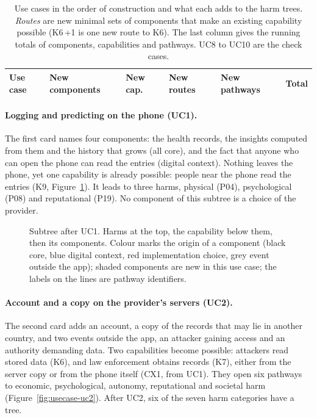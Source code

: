 \begin{table}[!t]
\centering
\begin{singlespace}
\caption[Use cases in the order of construction]{Use cases in the order of construction and what
each adds to the harm trees. \emph{Routes} are new minimal sets of components that make an
existing capability possible (K6\,+1 is one new route to K6). The last column gives the running
totals of components, capabilities and pathways. UC8 to UC10 are the check cases.}
\label{tab:usecase-steps}
\footnotesize
\begin{tabularx}{\textwidth}{@{}>{\raggedright\arraybackslash}p{3.3cm}>{\raggedright\arraybackslash}X>{\raggedright\arraybackslash}p{1.2cm}>{\raggedright\arraybackslash}p{1.6cm}>{\raggedright\arraybackslash}p{2.3cm}r@{}}
\toprule
\textbf{Use case} & \textbf{New components} & \textbf{New cap.} & \textbf{New routes} & \textbf{New pathways} & \textbf{Total} \\
\midrule
\end{tabularx}
\end{singlespace}
\end{table}

\paragraph{Logging and predicting on the phone (UC1).} The first card names four components:
the health records, the insights computed from them and the history that grows (all core), and
the fact that anyone who can open the phone can read the entries (digital context). Nothing leaves
the phone, yet one capability is already possible: people near the phone read the entries (K9,
Figure~\ref{fig:usecase-uc1}). It leads to three harms, physical (P04), psychological (P08) and
reputational (P19). No component of this subtree is a choice of the provider.

\begin{figure}[H]
\centering

\caption[Subtree of UC1]{Subtree after UC1. Harms at the top, the capability below them, then
its components. Colour marks the origin of a component (black core, blue digital context, red
implementation choice, grey event outside the app); shaded components are new in this use case;
the labels on the lines are pathway identifiers.}
\label{fig:usecase-uc1}
\end{figure}

\paragraph{Account and a copy on the provider's servers (UC2).} The second card adds an account, a
copy of the records that may lie in another country, and two events outside the app, an attacker
gaining access and an authority demanding data. Two capabilities become possible: attackers read
stored data (K6), and law enforcement obtains records (K7), either from the server copy or from
the phone itself (CX1, from UC1). They open six pathways to economic, psychological, autonomy, reputational and
societal harm (Figure~\ref{fig:usecase-uc2}). After UC2, six of the seven harm categories have
a tree.

